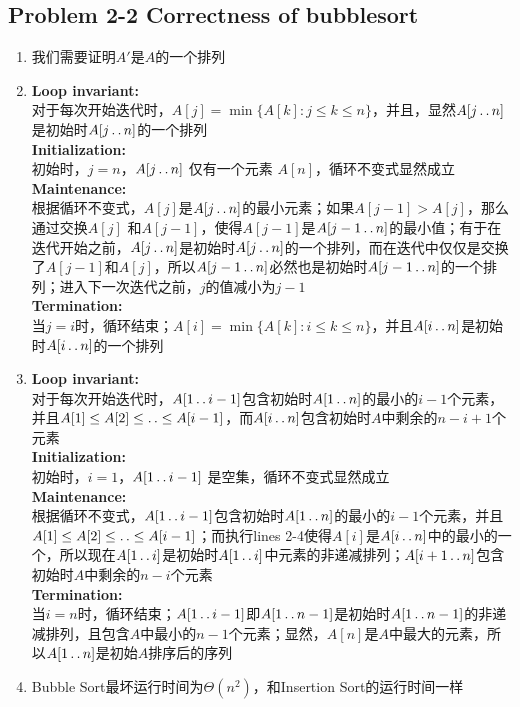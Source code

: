 \subsection*{Problem 2-2 Correctness of bubblesort}

\begin{enumerate}
	\item	我们需要证明$A'$是$A$的一个排列
	
	\item	{\bfseries Loop invariant:} \\
		对于每次开始迭代时，$A[j]=\min{\{ A[k]:j \leq k \leq n \}}$，并且，显然$A[j \mathinner{\ldotp\ldotp} n]$是初始时$A[j \mathinner{\ldotp\ldotp} n]$的一个排列 \\
		{\bfseries Initialization:} \\
		初始时，$j=n$，$A[j \mathinner{\ldotp\ldotp} n]$ 仅有一个元素 $A[n]$，循环不变式显然成立 \\
		{\bfseries Maintenance:} \\
		根据循环不变式，$A[j]$是$A[j \mathinner{\ldotp\ldotp} n]$的最小元素；如果$A[j - 1] > A[j]$，那么通过交换$A[j]$ 和$A[j - 1]$，使得$A[j - 1]$是$A[j - 1 \mathinner{\ldotp\ldotp} n]$的最小值；有于在迭代开始之前，$A[j \mathinner{\ldotp\ldotp} n]$是初始时$A[j \mathinner{\ldotp\ldotp} n]$的一个排列，而在迭代中仅仅是交换了$A[j - 1]$和$A[j]$，所以$A[j - 1 \mathinner{\ldotp\ldotp} n]$必然也是初始时$A[j - 1 \mathinner{\ldotp\ldotp} n]$的一个排列；进入下一次迭代之前，$j$的值减小为$j - 1$ \\
		{\bfseries Termination:} \\
		当$j = i$时，循环结束；$A[i]=\min{\{ A[k]:i \leq k \leq n \}}$，并且$A[i \mathinner{\ldotp\ldotp} n]$是初始时$A[i \mathinner{\ldotp\ldotp} n]$的一个排列
		
	\item	{\bfseries Loop invariant:} \\
		对于每次开始迭代时，$A[1 \mathinner{\ldotp\ldotp} i - 1]$包含初始时$A[1 \mathinner{\ldotp\ldotp} n]$的最小的$i - 1$个元素，并且$A[1] \leq A[2] \leq \mathinner{\ldotp\ldotp} \leq A[i - 1]$，而$A[i \mathinner{\ldotp\ldotp} n]$包含初始时$A$中剩余的$n - i + 1$个元素 \\
		{\bfseries Initialization:} \\
		初始时，$i=1$，$A[1 \mathinner{\ldotp\ldotp} i - 1]$ 是空集，循环不变式显然成立 \\
		{\bfseries Maintenance:} \\
		根据循环不变式，$A[1 \mathinner{\ldotp\ldotp} i - 1]$包含初始时$A[1 \mathinner{\ldotp\ldotp} n]$的最小的$i - 1$个元素，并且$A[1] \leq A[2] \leq \mathinner{\ldotp\ldotp} \leq A[i - 1]$；而执行lines 2-4使得$A[i]$是$A[i \mathinner{\ldotp\ldotp} n]$中的最小的一个，所以现在$A[1 \mathinner{\ldotp\ldotp} i]$是初始时$A[1 \mathinner{\ldotp\ldotp} i]$中元素的非递减排列；$A[i + 1 \mathinner{\ldotp\ldotp} n]$包含初始时$A$中剩余的$n - i$个元素\\
		{\bfseries Termination:} \\
		当$i = n$时，循环结束；$A[1 \mathinner{\ldotp\ldotp} i - 1]$即$A[1 \mathinner{\ldotp\ldotp} n - 1]$是初始时$A[1 \mathinner{\ldotp\ldotp} n - 1]$的非递减排列，且包含$A$中最小的$n - 1$个元素；显然，$A[n]$是$A$中最大的元素，所以$A[1 \mathinner{\ldotp\ldotp} n]$是初始$A$排序后的序列
	\item	Bubble Sort最坏运行时间为$\Theta(n^2)$，和Insertion Sort的运行时间一样
\end{enumerate}

